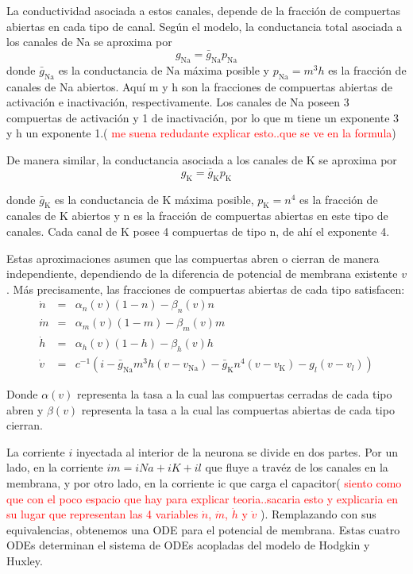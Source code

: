 \documentclass[aps,prl,twocolumn,groupedaddress]{revtex4-2}
\begin{document}
La conductividad asociada a estos canales, depende de la fracción de compuertas abiertas en cada tipo de canal. Según el modelo, la conductancia total asociada a los canales de Na se aproxima por
$$g_{\mathrm{Na}} = \bar{g}_{\mathrm{Na}}p_{\mathrm{Na}}$$
donde $\bar{g}_{\mathrm{Na}}$ es la conductancia de $\mathrm{Na}$ máxima posible y $p_{\mathrm{Na}} = m^3h$  es la fracción de canales de Na abiertos. Aquí m y h son la fracciones de compuertas abiertas de activación e inactivación, respectivamente. Los canales de Na poseen 3 compuertas de activación y 1 de inactivación, por lo que m tiene un exponente 3 y h un exponente 1.( \textcolor{red}{me suena redudante explicar esto..que se ve en la formula})

De manera similar, la conductancia asociada a los canales de K se aproxima por
$$g_{\mathrm{K}} = \bar{g}_{\mathrm{K}}p_{\mathrm{K}}$$

donde $\bar{g}_{\mathrm{K}}$  es la conductancia de K máxima posible, $p_{\mathrm{K}} = n^4$ es la fracción de canales de K abiertos y n es la fracción de compuertas abiertas en este tipo de canales. Cada canal de K posee 4 compuertas de tipo n, de ahí el exponente 4.

Estas aproximaciones asumen que las compuertas abren o cierran de manera independiente, dependiendo de la diferencia de potencial de membrana existente $v$. Más precisamente, las fracciones de compuertas abiertas de cada tipo satisfacen:
\begin{eqnarray*}
\dot{n}&=&\alpha_n(v)(1-n)-\beta_n(v) n\\
\dot{m}&=&\alpha_m(v)(1-m)-\beta_m(v) m\\
\dot{h}&=&\alpha_h(v)(1-h)-\beta_h(v) h\\
\dot{v}&=&c^{-1}(i-\bar{g}_{\mathrm{Na}}m^3h(v-v_{\mathrm{Na}})-\bar{g}_{\mathrm{K}}n^4(v-v_{\mathrm{K}})-g_{l}(v-v_{l}))
\end{eqnarray*}

Donde $\alpha(v)$ representa la tasa a la cual las compuertas cerradas de cada tipo abren y $\beta(v)$ representa la tasa a la cual las compuertas abiertas de cada tipo cierran.

La corriente $i$ inyectada al interior de la neurona se divide en dos partes. Por un lado, en la corriente  $im=iNa+iK+il$  que fluye a travéz de los canales en la membrana, y por otro lado, en la corriente  ic  que carga el capacitor( \textcolor{red}{siento como que con el poco espacio que hay para explicar teoria..sacaria esto y explicaria en su lugar que representan las 4 variables $\dot{n}$, $\dot{m}$, $\dot{h}$ y $\dot{v}$ }).
Remplazando con sus equivalencias, obtenemos una ODE para el potencial de membrana.
Estas cuatro ODEs determinan el sistema de ODEs acopladas del modelo de Hodgkin y Huxley.
\end{document}
